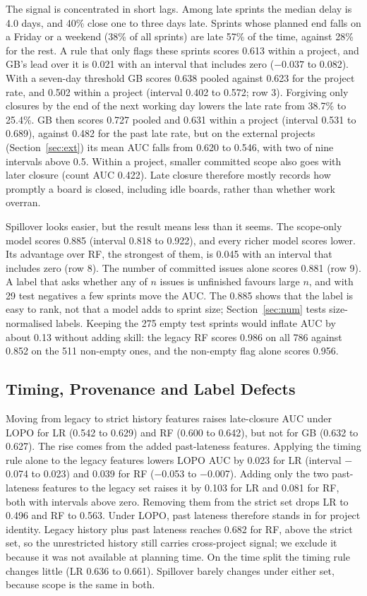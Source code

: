 \documentclass[conference]{IEEEtran}
\begin{document}
The signal is concentrated in short lags. Among late sprints the median delay is 4.0 days, and 40\% close one to three days late. Sprints whose planned end falls on a Friday or a weekend (38\% of all sprints) are late 57\% of the time, against 28\% for the rest. A rule that only flags these sprints scores 0.613 within a project, and GB's lead over it is 0.021 with an interval that includes zero ($-0.037$ to 0.082). With a seven-day threshold GB scores 0.638 pooled against 0.623 for the project rate, and 0.502 within a project (interval 0.402 to 0.572; row 3). Forgiving only closures by the end of the next working day lowers the late rate from 38.7\% to 25.4\%. GB then scores 0.727 pooled and 0.631 within a project (interval 0.531 to 0.689), against 0.482 for the past late rate, but on the external projects (Section~\ref{sec:ext}) its mean AUC falls from 0.620 to 0.546, with two of nine intervals above 0.5. Within a project, smaller committed scope also goes with later closure (count AUC 0.422). Late closure therefore mostly records how promptly a board is closed, including idle boards, rather than whether work overran.

Spillover looks easier, but the result means less than it seems. The scope-only model scores 0.885 (interval 0.818 to 0.922), and every richer model scores lower. Its advantage over RF, the strongest of them, is 0.045 with an interval that includes zero (row 8). The number of committed issues alone scores 0.881 (row 9). A label that asks whether any of $n$ issues is unfinished favours large $n$, and with 29 test negatives a few sprints move the AUC. The 0.885 shows that the label is easy to rank, not that a model adds to sprint size; Section~\ref{sec:num} tests size-normalised labels. Keeping the 275 empty test sprints would inflate AUC by about 0.13 without adding skill: the legacy RF scores 0.986 on all 786 against 0.852 on the 511 non-empty ones, and the non-empty flag alone scores 0.956.

\subsection{Timing, Provenance and Label Defects}
\label{sec:prov}

Moving from legacy to strict history features raises late-closure AUC under LOPO for LR (0.542 to 0.629) and RF (0.600 to 0.642), but not for GB (0.632 to 0.627). The rise comes from the added past-lateness features. Applying the timing rule alone to the legacy features lowers LOPO AUC by 0.023 for LR (interval $-$0.074 to 0.023) and 0.039 for RF ($-$0.053 to $-$0.007). Adding only the two past-lateness features to the legacy set raises it by 0.103 for LR and 0.081 for RF, both with intervals above zero. Removing them from the strict set drops LR to 0.496 and RF to 0.563. Under LOPO, past lateness therefore stands in for project identity. Legacy history plus past lateness reaches 0.682 for RF, above the strict set, so the unrestricted history still carries cross-project signal; we exclude it because it was not available at planning time. On the time split the timing rule changes little (LR 0.636 to 0.661). Spillover barely changes under either set, because scope is the same in both.
\end{document}
